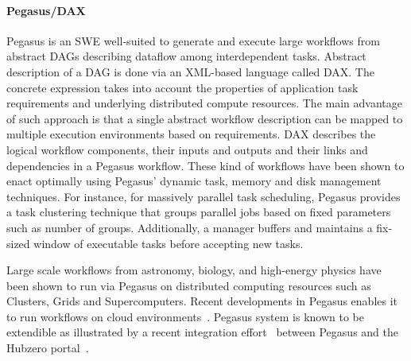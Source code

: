 %
\paragraph{Pegasus/DAX} Pegasus \cite{deelman-peg} is an SWE
well-suited to generate and execute large workflows from abstract DAGs
describing dataflow among interdependent tasks. Abstract description of a DAG
is done via an XML-based language called DAX. The concrete expression takes
into account the properties of application task requirements and underlying
distributed compute resources.  The main advantage of such approach is that a
single abstract workflow description can be mapped to multiple execution
environments based on requirements. DAX describes the logical workflow
components, their inputs and outputs and their links and dependencies in a
Pegasus workflow. These kind of workflows have been shown to enact optimally
using Pegasus' dynamic task, memory and disk management techniques. For
instance, for massively parallel task scheduling, Pegasus provides a task
clustering technique that groups parallel jobs based on fixed parameters such
as number of groups. Additionally, a manager buffers and maintains a fix-sized
window of executable tasks before accepting new tasks.

Large scale workflows from astronomy, biology, and high-energy physics have
been shown to run via Pegasus on distributed computing resources such as
Clusters, Grids and Supercomputers.  Recent developments in Pegasus enables it
to run workflows on cloud environments~\cite{peg-cloud}. Pegasus system is
known to be extendible as illustrated by a recent integration
effort~\cite{peg-hubzero} between Pegasus and the Hubzero
portal~\cite{hubzero}.
